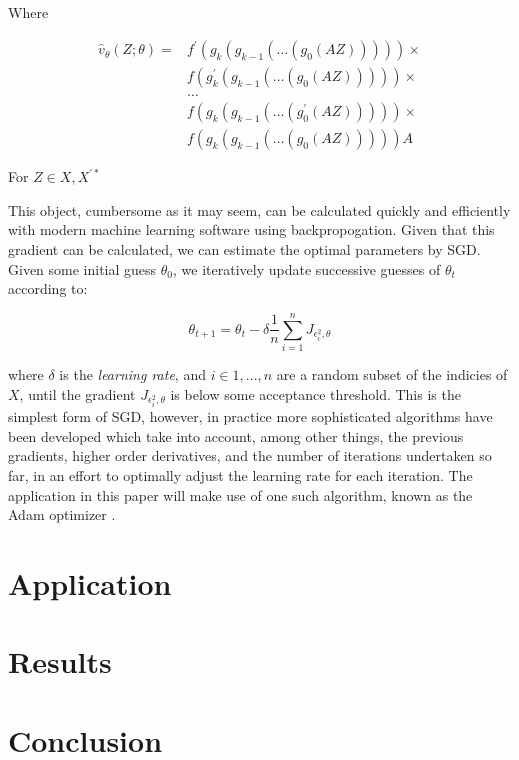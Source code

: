 \documentclass{article}
\begin{document}
Where

\begin{equation}
\begin{aligned}
    \hat{v}_\theta(Z; \theta) = & f^\prime(g_k(g_{k-1}(\dots(g_0(AZ))))) \times \\
             & f(g_k^\prime(g_{k-1}(\dots(g_0(AZ))))) \times \\
             & \dots \\
             & f(g_k(g_{k-1}(\dots(g^\prime_0(AZ))))) \times \\
             & f(g_k(g_{k-1}(\dots(g_0(AZ)))))A
\end{aligned}
\end{equation}

For $Z \in {X, X^{\prime *}}$

This object, cumbersome as it may seem, can be calculated quickly and efficiently with modern machine learning software using backpropogation. Given that this gradient can be calculated, we can estimate the optimal parameters by SGD. Given some initial guess $\theta_0$, we iteratively update successive guesses of $\theta_t$ according to:

\begin{equation}
    \theta_{t+1} = \theta_t - \delta \frac{1}{n} \sum_{i=1}^{n} J_{\epsilon_i^2,\theta}
\end{equation}

where $\delta$ is the \textit{learning rate}, and $i \in {1, ..., n}$ are a random subset of the indicies of $X$, until the gradient $J_{\epsilon_i^2,\theta}$ is below some acceptance threshold. This is the simplest form of SGD, however, in practice more sophisticated algorithms have been developed which take into account, among other things, the previous gradients, higher order derivatives, and the number of iterations undertaken so far, in an effort to optimally adjust the learning rate for each iteration. The application in this paper will make use of one such algorithm, known as the Adam optimizer \parencite{kingma2014adam}.

\section{Application} \label{application}

\section{Results} \label{results}

\section{Conclusion} \label{conclusion}



\newpage
\printbibliography
\end{document}
